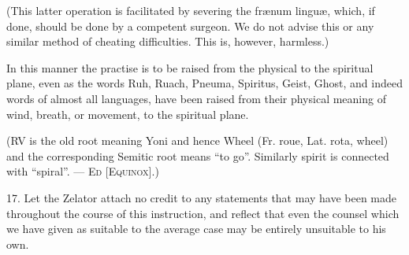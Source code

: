 (This latter operation is facilitated by severing the fr\ae{}num lingu\ae{}, which, if done, should be done by a competent surgeon. We do not advise this or any similar method of cheating difficulties. This is, however, harmless.)

In this manner the practise is to be raised from the physical to the spiritual plane, even as the words Ruh, Ruach, Pneuma, Spiritus, Geist, Ghost, and indeed words of almost all languages, have been raised from their physical meaning of wind, breath, or movement, to the spiritual plane.

(RV is the old root meaning Yoni and hence Wheel (Fr. roue, Lat. rota, wheel) and the corresponding Semitic root means \enquote{to go}. Similarly spirit is connected with \enquote{spiral}. --- \textsc{Ed [Equinox]}.)

17. Let the Zelator attach no credit to any statements that may have been made throughout the course of this instruction, and reflect that even the counsel which we have given as suitable to the average case may be entirely unsuitable to his own.

